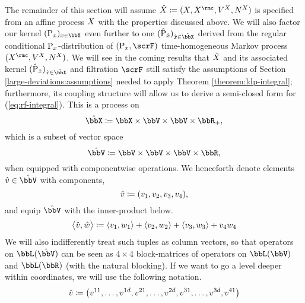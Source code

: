 The remainder of this section will assume $\hat\X \defeq (\X, \X^\rmc, \V^\X, \N^\X)$ is specified from an affine process $X$ with the properties discussed above.
We will also factor our kernel $(\Prb_\stateVar)_{\stateVar\in\stateSpace}$ even further to one $(\hat\Prb_{\hat\stateVar})_{\hat\stateVar\in\hat\stateSpace}$ derived from the regular conditional ${\operatorname{P}}_x$-distribution of $(\Prb_\stateVar, \scrF)$ time-homogeneous Markov process $(\X^\rmc, \V^\X, \N^\X)$.
We will see in the coming results that $\hat{X}$ and its associated kernel $(\hat\Prb_{\hat\stateVar})_{\hat\stateVar\in\hat\stateSpace}$ and filtration $\scrF$ still satisfy the assumptions of Section \ref{large-deviations:assumptions} needed to apply Theorem \ref{theorem:ldp-integral}; furthermore, its coupling structure will allow us to derive a semi-closed form for (\ref{eq:rf-integral}).
This is a process on 
\begin{equation*}
  \hat\stateSpace \defeq \stateSpace \times \vecSpace \times \vecSpace \times \bbR_+,
\end{equation*}
which is a subset of vector space
\begin{equation*}
  \hat\vecSpace \defeq \vecSpace \times \vecSpace \times \vecSpace \times \bbR,
\end{equation*}
when equipped with componentwise operations.
We henceforth denote elements $\hat\vecVar \in \hat\vecSpace$ with components,
\begin{equation*}
  \hat{v} \coloneqq (v_1, v_2, v_3, v_4),
\end{equation*}
and equip $\hat\vecSpace$ with the inner-product below.
\begin{equation*}
  {\big\langle \hat{v}, \hat w \big\rangle} \coloneqq {\langle v_1 , w_1 \rangle} + {\langle v_2 , w_2 \rangle} + {\langle v_3 , w_3 \rangle} + v_4 w_4
\end{equation*}
We will also indifferently treat such tuples as column vectors, so that operators on $\bbL(\hat\vecSpace)$ can be seen as $4\times4$ block-matrices of operators on $\bbL(\vecSpace)$ and $\bbL(\bbR)$ (with the natural blocking).
If we want to go a level deeper within coordinates, we will use the following notation.
\begin{equation*}
  \hat{v} \coloneqq \big(v^{11}, \ldots, v^{1d}, v^{21}, \ldots, v^{2d}, v^{31}, \ldots, v^{3d}, v^{41} \big)
\end{equation*}




